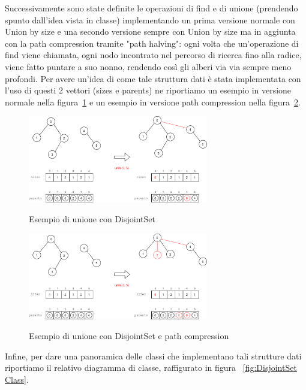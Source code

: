 Successivamente sono state definite le operazioni di find e di unione (prendendo spunto dall'idea vista in classe) implementando un prima versione normale con Union by size e una secondo versione sempre con Union by size ma in aggiunta con la path compression tramite "path halving": ogni volta che un'operazione di find viene chiamata, ogni nodo incontrato nel percorso di ricerca fino alla radice, viene fatto puntare a suo nonno, rendendo così gli alberi via via sempre meno profondi. Per avere un'idea di come tale struttura dati è stata implementata con l'uso di questi 2 vettori (sizes e parents) ne riportiamo un esempio in versione normale nella figura~\ref{fig:disjointset example} e un esempio in versione path compression nella figura~\ref{fig:disjointset path c example}.

\begin{figure}[h]
	\caption{Esempio di unione con DisjointSet}
	\centering
	\includegraphics[width=0.7\textwidth]{./images/DisjointSetExample.png}
	\label{fig:disjointset example}
\end{figure}

\begin{figure}[h]
	\caption{Esempio di unione con DisjointSet e path compression}
	\centering
	\includegraphics[width=0.7\textwidth]{./images/DisjointSetCompressedExample.png}
	\label{fig:disjointset path c example}
\end{figure}

Infine, per dare una panoramica delle classi che implementano tali strutture dati riportiamo il relativo diagramma di classe, raffigurato in figura ~\ref{fig:DisjointSet Class}.

